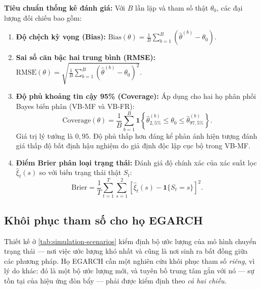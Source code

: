 \documentclass[12pt,a4paper]{article}
\numberwithin{equation}{section}
\theoremstyle{definition}
\begin{document}
	\textbf{Tiêu chuẩn thống kê đánh giá:}
	Với $B$ lần lặp và tham số thật $\theta_0$, các đại lượng đối chiếu bao gồm:
	\begin{enumerate}
		\item \textbf{Độ chệch kỳ vọng (Bias):} $\mathrm{Bias}(\theta) = \frac{1}{B}\sum_{b=1}^{B}\left(\hat\theta^{(b)} - \theta_0\right)$.
		\item \textbf{Sai số căn bậc hai trung bình (RMSE):} $\mathrm{RMSE}(\theta) = \sqrt{\frac{1}{B}\sum_{b=1}^{B}\left(\hat\theta^{(b)} - \theta_0\right)^2}$.
		\item \textbf{Độ phủ khoảng tin cậy 95\% (Coverage):} Áp dụng cho hai họ phân phối Bayes biến phân (VB-MF và VB-FR):
		\begin{equation}
			\mathrm{Coverage}(\theta) = \frac{1}{B}\sum_{b=1}^{B}\symbf 1\left\{\hat\theta_{2{,}5\%}^{(b)} \le \theta_0 \le \hat\theta_{97{,}5\%}^{(b)}\right\}.
			\label{eq:coverage}
		\end{equation}
		Giá trị lý tưởng là $0{,}95$. Độ phủ thấp hơn đáng kể phản ánh hiện tượng đánh giá thấp độ bất định hậu nghiệm do giả định độc lập cục bộ trong VB-MF.
		\item \textbf{Điểm Brier phân loại trạng thái:} Đánh giá độ chính xác của xác suất lọc $\hat\xi_t(s)$ so với biến trạng thái thật $S_t$:
		\begin{equation}
			\mathrm{Brier} = \frac{1}{T}\sum_{t=1}^{T}\sum_{s=1}^{2}\left[\hat\xi_t(s) - \symbf 1\{S_t=s\}\right]^2.
			\label{eq:brier-state}
		\end{equation}
	\end{enumerate}

	\subsection{Khôi phục tham số cho họ EGARCH}\label{subsec:egarch-recovery}
	Thiết kế ở \cref{tab:simulation-scenarios} kiểm định bộ ước lượng của mô hình chuyển
	trạng thái --- nơi việc ước lượng khó nhất và cũng là nơi sinh ra bất đồng giữa các
	phương pháp. Họ EGARCH cần một nghiên cứu khôi phục tham số \emph{riêng}, vì lý do khác:
	đó là một bộ ước lượng mới, và tuyên bố trung tâm gắn với nó --- sự tồn tại của hiệu ứng
	đòn bẩy --- phải được kiểm định theo \emph{cả hai chiều}.
\end{document}
